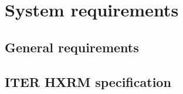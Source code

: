 \section{System requirements}
\subsection{General requirements}
\subsection{ITER HXRM specification}